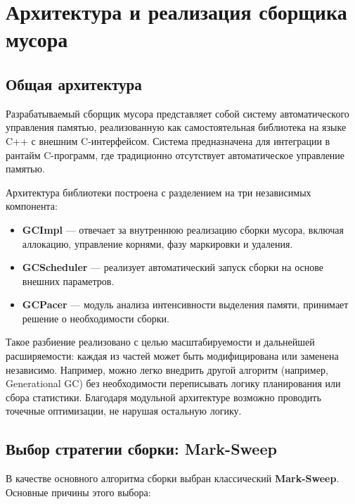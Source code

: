 \section{Архитектура и реализация сборщика мусора}

\subsection{Общая архитектура}

Разрабатываемый сборщик мусора представляет собой систему автоматического уп\-равления памятью, реализованную как самостоятельная библиотека на языке C++ с внешним C-интерфейсом. Система предназначена для интеграции в рантайм C-программ, где традиционно отсутствует автоматическое управление памятью.

Архитектура библиотеки построена с разделением на три независимых компонента:
\begin{itemize}
    \item \textbf{GCImpl} — отвечает за внутреннюю реализацию сборки мусора, включая аллокацию, управление корнями, фазу маркировки и удаления.
    \item \textbf{GCScheduler} — реализует автоматический запуск сборки на основе внешних параметров.
    \item \textbf{GCPacer} — модуль анализа интенсивности выделения памяти, принимает решение о необходимости сборки.
\end{itemize}

Такое разбиение реализовано с целью масштабируемости и дальнейшей расширяемости: каждая из частей может быть модифицирована или заменена независимо. Например, можно легко внедрить другой алгоритм (например, Generational GC) без необходимости переписывать логику планирования или сбора статистики. Благодаря модульной архитектуре возможно проводить точечные оптимизации, не нарушая остальную логику.

\subsection{Выбор стратегии сборки: Mark-Sweep}

В качестве основного алгоритма сборки выбран классический \textbf{Mark-Sweep}. Основные причины этого выбора:


